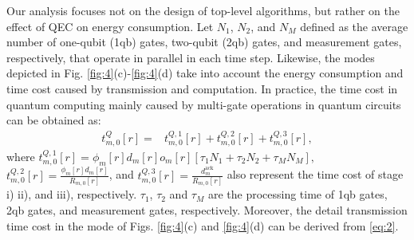 \documentclass[journal]{IEEEtran}
\begin{document}
Our analysis focuses not on the design of top-level algorithms, but rather on the effect of QEC on energy consumption.
Let $N_1$, $N_2$, and $N_M$ defined as the average number of one-qubit (1qb) gates, two-qubit (2qb) gates, and measurement gates, respectively, that operate in parallel in each time step.
Likewise, the modes depicted in Fig. \ref{fig:4}(c)-\ref{fig:4}(d) take into account the energy consumption and time cost caused by transmission and computation.
In practice, the time cost in quantum computing mainly caused by multi-gate operations in quantum circuits\cite{fellous2022optimizing} can be obtained as:
	\begin{align}\label{eq:5}
	    t_{m,0}^Q[r]=&t_{m,0}^{Q,1}[r]+t_{m,0}^{Q,2}[r]+t_{m,0}^{Q,3}[r],
	\end{align}
where $t_{m,0}^{Q,1}[r]=\phi_m[r]d_m[r]o_m[r][\tau_1N_1+\tau_2N_2+\tau_MN_M],$ $ t_{m,0}^{Q,2}[r]=\frac{\phi_m[r]d_m[r]}{R_{m,0}[r]}$, and $t_{m,0}^{Q,3}[r]=\frac{d_m^{\text{ack}}}{R_{m,0}[r]}$ also represent the time cost of stage i) ii), and iii), respectively.
$\tau_1$, $\tau_2$ and $\tau_M$ are the processing time of 1qb gates, 2qb gates, and measurement gates, respectively.
Moreover, the detail transmission time cost in the mode of Figs. \ref{fig:4}(c) and \ref{fig:4}(d) can be derived from  \eqref{eq:2}.
\end{document}

